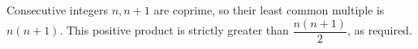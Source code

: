 Consecutive integers $n,n+1$ are coprime, so their least common multiple is $n(n+1)$. This positive product is strictly greater than $\dfrac{n(n+1)}{2}$, as required.
